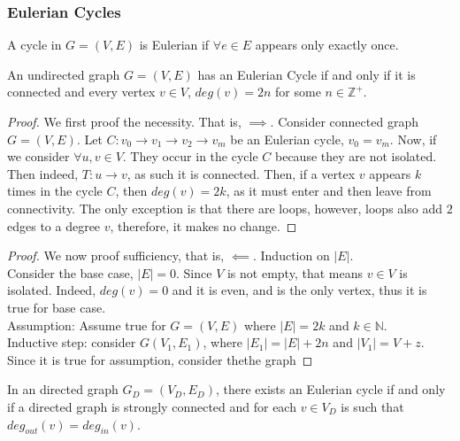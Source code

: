 \documentclass[a4paper]{article}
\theoremstyle{plain}
\newtheorem{thm}{Theorem}[section]
\theoremstyle{definition}
\newtheorem{defn}{Definition}[section]
\theoremstyle{remark}
\begin{document}
\subsubsection{Eulerian Cycles}
\begin{tcolorbox}[colback=black!3!white,colframe=black!60!white,title=\begin{defn}Eulerian Cycle \label{Eulerian Cycle}\end{defn}]
A cycle in $G = (V,E)$ is Eulerian if $\forall e \in E$ appears only exactly once. 
\end{tcolorbox}
\begin{tcolorbox}[colback=black!3!white,colframe=black!60!white,title=\begin{thm}Existence of an Eulerian Cycle \label{Existence of an Eulerian Cycle}\end{thm}]
An undirected graph $G=(V,E)$ has an Eulerian Cycle if and only if it is connected and every vertex $v \in V$, $deg(v)=2n$ for some $n \in \mathbb{Z}^{+}$.  \\
\begin{proof}
	We first proof the necessity. That is, $ \implies$. Consider connected graph $G=(V,E)$. Let $C : v_0\to v_1\to v_2 \to v_m$ be an Eulerian cycle, $v_0=v_m$. Now, if we consider $\forall u,v \in V$. They occur in the cycle $C$ because they are not isolated. Then indeed, $T: u \to v$, as such it is connected. Then, if a vertex $v$ appears $k$ times in the cycle $C$, then $deg(v)=2k$, as it must enter and then leave from connectivity. The only exception is that there are loops, however, loops also add $2$ edges to a degree $v$, therefore, it makes no change. 
\end{proof}
\begin{proof}
	We now proof sufficiency, that is, $\impliedby $. Induction on $|E|$. \\
	Consider the base case, $|E|=0$. Since  $V$ is not empty, that means $v \in V$ is isolated. Indeed, $deg(v) = 0$ and it is even, and is the only vertex, thus it is true for base case. \\
	Assumption: Assume true for $G=(V,E)$ where $|E| = 2k$ and $ k \in \mathbb{N}$. \\
	Inductive step: consider $G(V_1,E_1)$, where $|E_1| = |E| + 2n$ and $|V_1| = V + z$. Since it is true for assumption, consider thethe graph 
\end{proof}

In an directed graph $G_D = (V_D,E_D)$, there exists an Eulerian cycle if and only if a directed graph is strongly connected and for each $v \in V_D$ is such that $deg_{out}(v)=deg_{in}(v)$.
\end{tcolorbox}
\end{document}
